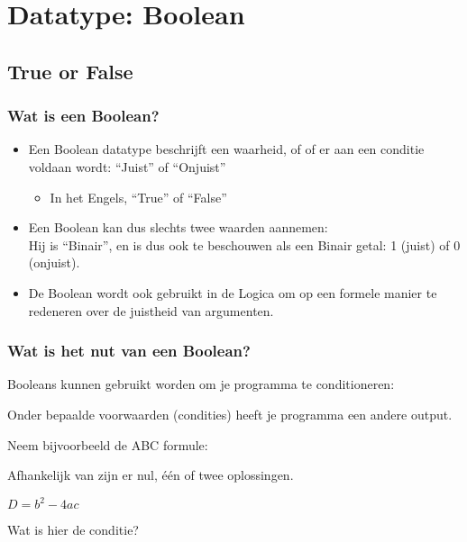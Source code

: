 \section{Datatype: Boolean}

\subsection{True or False}

\begin{frame}
\frametitle{Wat is een Boolean?}

\begin{itemize}
  \item<1-> Een Boolean datatype beschrijft een waarheid,
  			of of er aan een conditie voldaan wordt: ``Juist'' of ``Onjuist''
  \begin{itemize}
    \item<2-> In het Engels, ``True'' of ``False''
  \end{itemize}
  \item<3-> Een Boolean kan dus slechts twee waarden aannemen: \\ Hij is ``Binair'',
  			en is dus ook te beschouwen als een Binair getal: 1 (juist) of 0 (onjuist).
  \item<4-> De Boolean wordt ook gebruikt in de Logica om op een formele manier
  			te redeneren over de juistheid van argumenten.		
\end{itemize}

\end{frame}





\begin{frame}
\frametitle{Wat is het nut van een Boolean?}

Booleans kunnen gebruikt worden om je programma te conditioneren:

Onder bepaalde voorwaarden (condities) heeft je programma een andere output.

\vspace{0.5cm}
\pause %
Neem bijvoorbeeld de ABC formule:

\pause %
Afhankelijk van
zijn er nul, \'e\'en of twee oplossingen.

$D=b^2-4ac$

\vspace{0.3cm}
\pause %
Wat is hier de conditie?
\pause %

\end{frame}





